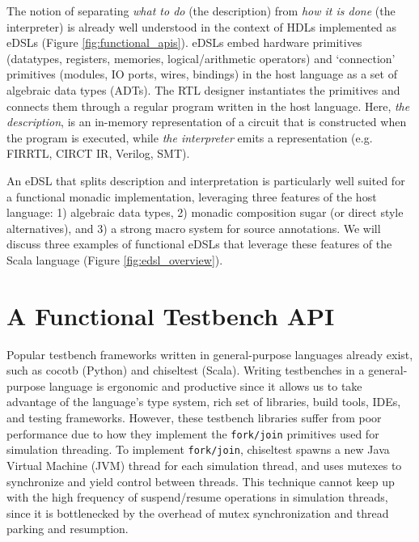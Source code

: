 \documentclass[sigplan,review,nonacm,9pt]{acmart}
\begin{document}
The notion of separating \textit{what to do} (the description) from \textit{how it is done} (the interpreter) is already well understood in the context of HDLs implemented as eDSLs (Figure \ref{fig:functional_apis}).
eDSLs embed hardware primitives (datatypes, registers, memories, logical/arithmetic operators) and `connection' primitives (modules, IO ports, wires, bindings) in the host language as a set of algebraic data types (ADTs).
The RTL designer instantiates the primitives and connects them through a regular program written in the host language.
Here, \textit{the description}, is an in-memory representation of a circuit that is constructed when the program is executed, while \textit{the interpreter} emits a representation (e.g. FIRRTL\cite{firrtl}, CIRCT IR\cite{circt}, Verilog, SMT).

An eDSL that splits description and interpretation is particularly well suited for a functional monadic implementation, leveraging three features of the host language: 1) algebraic data types, 2) monadic composition sugar (or direct style alternatives\cite{dotty_cps_async, koka}), and 3) a strong macro system for source annotations.
We will discuss three examples of functional eDSLs that leverage these features of the Scala language (Figure \ref{fig:edsl_overview}).

\section{A Functional Testbench API}

Popular testbench frameworks written in general-purpose languages already exist, such as cocotb\cite{cocotb} (Python) and chiseltest\cite{chiseltest} (Scala).
Writing testbenches in a general-purpose language is ergonomic and productive since it allows us to take advantage of the language's type system, rich set of libraries, build tools, IDEs, and testing frameworks.
However, these testbench libraries suffer from poor performance due to how they implement the \texttt{fork/join} primitives used for simulation threading.
To implement \texttt{fork/join}, chiseltest spawns a new Java Virtual Machine (JVM) thread for each simulation thread, and uses mutexes to synchronize and yield control between threads.
This technique cannot keep up with the high frequency of suspend/resume operations in simulation threads, since it is bottlenecked by the overhead of mutex synchronization and thread parking and resumption.
\end{document}
